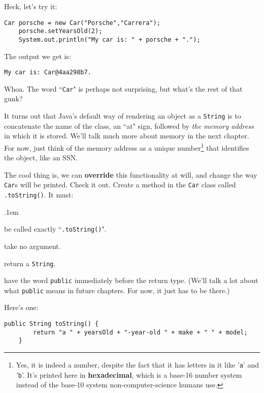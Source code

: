 Heck, let's try it:

\begin{Verbatim}[samepage=true,fontsize=\scriptsize,frame=single]
    Car porsche = new Car("Porsche","Carrera");
    porsche.setYearsOld(2);
    System.out.println("My car is: " + porsche + ".");
\end{Verbatim}

The output we get is:

\begin{verbatim}
My car is: Car@4aa298b7.
\end{verbatim}

Whoa. The word ``\texttt{Car}" is perhaps not surprising, but what's the rest
of that gunk?

It turns out that Java's default way of rendering an object as a
\texttt{String} is to concatenate the name of the class, an ``at" sign,
followed by \textit{the memory address} in which it is stored. We'll talk much
more about memory in the next chapter. For now, just think of the memory
address as a unique number\footnote{Yes, it is indeed a number, despite the
fact that it has letters in it like '\texttt{a}' and '\texttt{b}'. It's
printed here in \textbf{hexadecimal}, which is a base-16 number system instead
of the base-10 system non-computer-science humans use.} that identifies the
object, like an SSN.

\begin{samepage}
\label{pg:toString}
The cool thing is, we can \textbf{override} this functionality at will, and
change the way \texttt{Car}s will be printed. Check it out. Create a method in
the \texttt{Car} class called \texttt{.toString()}. It must:

\begin{compactenum}
\itemsep.1em
\item be called exactly ``\texttt{.toString()}".
\item take no argument.
\item return a \texttt{String}.
\item have the word \texttt{public} immediately before the return type. (We'll
talk a lot about what \texttt{public} means in future chapters. For now, it just has to
be there.)
\end{compactenum}
\end{samepage}

Here's one:

\begin{Verbatim}[samepage=true,fontsize=\scriptsize,frame=single]
    public String toString() {
        return "a " + yearsOld + "-year-old " + make + " " + model;
    }
\end{Verbatim}

